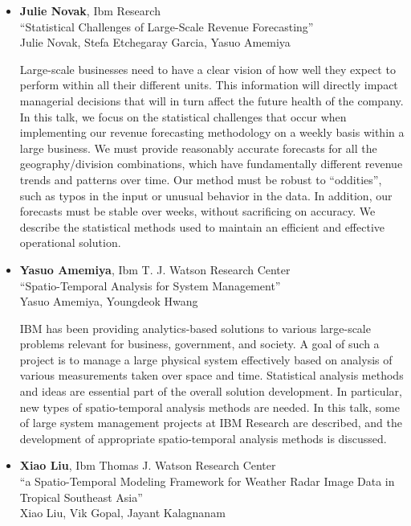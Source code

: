 \begin{itemize}
\item \textbf{Julie Novak}, Ibm Research \\
``Statistical Challenges of Large-Scale Revenue Forecasting'' \\
Julie Novak, Stefa Etchegaray Garcia, Yasuo Amemiya


Large-scale businesses need to have a clear vision of how well they expect to perform within all their different units. This information will directly impact managerial decisions that will in turn affect the future health of the company. In this talk, we focus on the statistical challenges that occur when implementing our revenue forecasting methodology on a weekly basis within a large business. We must provide reasonably accurate forecasts for all the geography/division combinations, which have fundamentally different revenue trends and patterns over time. Our method must be robust to “oddities”, such as typos in the input or unusual behavior in the data. In addition, our forecasts must be stable over weeks, without sacrificing on accuracy. We describe the statistical methods used to maintain an efficient and effective operational solution. 

\item \textbf{Yasuo Amemiya}, Ibm T. J. Watson Research Center \\
``Spatio-Temporal Analysis for System Management'' \\
Yasuo Amemiya, Youngdeok Hwang


IBM has been providing analytics-based solutions to various large-scale problems relevant for business, government, and society.  A goal of such a project is to manage a large physical system effectively based on analysis of various measurements taken over space and time.  Statistical analysis methods and ideas are essential part of the overall solution development.  In particular, new types of spatio-temporal analysis methods are needed.  In this talk, some of large system management projects at IBM Research are described, and the development of appropriate spatio-temporal analysis methods is discussed.

\item \textbf{Xiao Liu}, Ibm Thomas J. Watson Research Center \\
``a Spatio-Temporal Modeling Framework for Weather Radar Image Data in Tropical Southeast Asia'' \\
Xiao Liu,   Vik Gopal,   Jayant Kalagnanam



\end{itemize}
